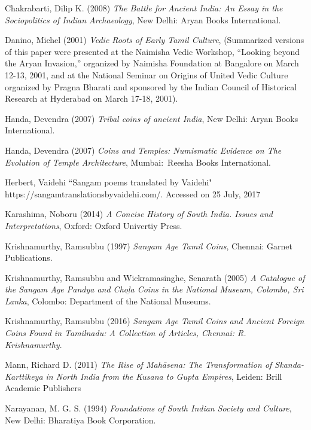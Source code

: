 \begin{thebibliography}{99}
 Chakrabarti, Dilip K. (2008) \textit{The Battle for Ancient India: An Essay in the Sociopolitics of Indian Archaeology}, New Delhi: Aryan Books International.

  Danino, Michel (2001) \textit{Vedic Roots of Early Tamil Culture}, (Summarized versions of this paper were presented at the Naimisha Vedic Workshop, “Looking beyond the Aryan Invasion,” organized by Naimisha Foundation at Bangalore on March 12-13, 2001, and at the National Seminar on Origins of United Vedic Culture organized by Pragna Bharati and sponsored by the Indian Council of Historical Research at Hyderabad on March 17-18, 2001).

  Handa, Devendra (2007) \textit{Tribal coins of ancient India}, New Delhi: Aryan Books International.

  Handa, Devendra (2007) \textit{Coins and Temples: Numismatic Evidence on The Evolution of Temple Architecture}, Mumbai: Reesha Books International.

  Herbert, Vaidehi “Sangam poems translated by Vaidehi" https://sangamtranslationsbyvaidehi.com/. Accessed on 25 July, 2017

  Karashima, Noboru (2014) \textit{A Concise History of South India. Issues and Interpretations}, Oxford: Oxford Univertiy Press.

  Krishnamurthy, Ramsubbu (1997) \textit{Sangam Age Tamil Coins}, Chennai: Garnet Publications.

  Krishnamurthy, Ramsubbu and Wickramasinghe, Senarath (2005) \textit{A Catalogue of the Sangam Age Pandya and Choḻa Coins in the National Museum, Colombo, Sri Lanka}, Colombo: Department of the National Museums.

  Krishnamurthy, Ramsubbu (2016) \textit{Sangam Age Tamil Coins and Ancient Foreign Coins Found in Tamilnadu: A Collection of Articles, Chennai: R. Krishnamurthy}.

  Mann, Richard D. (2011) \textit{The Rise of Mahāsena: The Transformation of Skanda-Karttikeya in North India from the Kusana to Gupta Empires}, Leiden: Brill Academic Publishers

  Narayanan, M. G. S. (1994) \textit{Foundations of South Indian Society and Culture}, New Delhi: Bharatiya Book Corporation.


\end{thebibliography}
